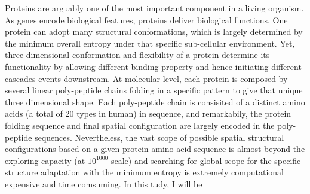 Proteins are arguably one of the most important component in a living organism. As genes encode biological features, proteins deliver biological functions. One protein can adopt many structural conformations, which is largely determined by the minimum overall entropy under that specific sub-cellular environment. Yet, three dimensional conformation and flexibility of a protein determine its functionality by allowing different binding property and hence initiating different cascades events downstream. At molecular level, each protein is composed by several linear poly-peptide chains folding in a specific pattern to give that unique three dimensional shape. Each poly-peptide chain is consisited of a distinct amino acids (a total of 20 types in human) in sequence, and remarkabily, the protein folding sequence and final spatial configuration are largely encoded in the poly-peptide sequences. Nevertheless, the vast scope of possible spatial structural configurations based on a given protein amino acid sequence is almost beyond the exploring capacity (at $10^{1000}$ scale) and searching for global scope for the specific structure adaptation with the minimum entropy is extremely computational expensive and time comsuming. In this tudy, I will be 